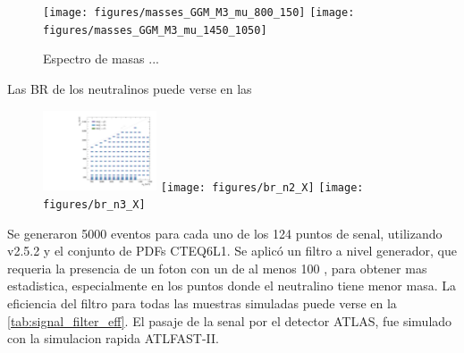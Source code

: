 \begin{figure}[ht!]
   \centering
   \texttt{[image: figures/masses\_GGM\_M3\_mu\_800\_150]}
   \texttt{[image: figures/masses\_GGM\_M3\_mu\_1450\_1050]}

   \caption{Espectro de masas ...}
   \label{fig:mass_spectra}
\end{figure}




Las BR de los neutralinos puede verse en las

\begin{figure}[!ht]
  \centering
  \includegraphics[width=0.3\textwidth]{figures/br_n1_X}
  \texttt{[image: figures/br\_n2\_X]}
  \texttt{[image: figures/br\_n3\_X]}
\end{figure}





Se generaron 5000 eventos para cada uno de los 124 puntos de senal, utilizando {\herwigpp} v2.5.2\cite{Bahr:2008pv}
y el conjunto de PDFs CTEQ6L1\cite{Nadolsky:2008zw}. Se aplicó un filtro a nivel generador, que requeria
la presencia de un foton con un {\pt} de al menos 100 \gev, para obtener mas estadistica, especialmente
en los puntos donde el neutralino tiene menor masa. La eficiencia del filtro para todas las muestras
simuladas puede verse en la \cref{tab:signal_filter_eff}.
El pasaje de la senal por el detector ATLAS, fue simulado con la simulacion rapida \textsc{ATLFAST-II}\cite{Richter-Was:683751}.


